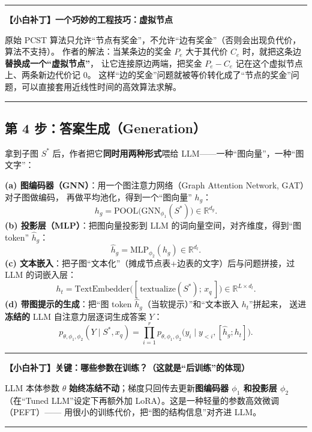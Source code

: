 \documentclass[11pt,UTF8,fontset=fandol]{ctexart}
\newenvironment{tip}[1]{%
  \par\smallskip\noindent\rule{\linewidth}{0.4pt}\par\nobreak
  \noindent\textbf{【小白补丁】#1}\par\nobreak\noindent\ignorespaces
}{%
  \par\noindent\rule{\linewidth}{0.4pt}\par\smallskip
}
\begin{document}
\begin{tip}{一个巧妙的工程技巧：虚拟节点}
原始 PCST 算法只允许“节点有奖金”，不允许“边有奖金”（否则会出现负代价，算法不支持）。
作者的解法：当某条边的奖金 $P_e$ 大于其代价 $C_e$ 时，就把这条边\textbf{替换成一个“虚拟节点”}，
让它连接原边两端，把奖金 $P_e-C_e$ 记在这个虚拟节点上、两条新边代价记 0。
这样“边的奖金”问题就被等价转化成了“节点的奖金”问题，可以直接套用近线性时间的高效算法求解。
\end{tip}

\subsection{第 4 步：答案生成（Generation）}
拿到子图 $S^\ast$ 后，作者把它\textbf{同时用两种形式}喂给 LLM——一种“图向量”，一种“图文字”：

\textbf{(a) 图编码器（GNN）}：用一个图注意力网络（Graph Attention Network, GAT）对子图做编码，
再做平均池化，得到一个“图向量” $h_g$：
\begin{equation*}
  h_g=\mathrm{POOL}\big(\mathrm{GNN}_{\phi_1}(S^\ast)\big)\in\mathbb{R}^{d_g}.\tag{5}
\end{equation*}
\textbf{(b) 投影层（MLP）}：把图向量投影到 LLM 的词向量空间，对齐维度，得到“图 token” $\hat h_g$：
\begin{equation*}
  \hat h_g=\mathrm{MLP}_{\phi_2}(h_g)\in\mathbb{R}^{d_l}.\tag{6}
\end{equation*}
\textbf{(c) 文本嵌入}：把子图“文本化”（摊成节点表+边表的文字）后与问题拼接，过 LLM 的词嵌入层：
\begin{equation*}
  h_t=\mathrm{TextEmbedder}\big([\,\mathrm{textualize}(S^\ast);\,x_q\,]\big)\in\mathbb{R}^{L\times d_l}.\tag{7}
\end{equation*}
\textbf{(d) 带图提示的生成}：把“图 token $\hat h_g$（当软提示）”和“文本嵌入 $h_t$”拼起来，
送进\textbf{冻结的} LLM 自注意力层逐词生成答案 $Y$：
\begin{equation*}
  p_{\theta,\phi_1,\phi_2}(Y\mid S^\ast,x_q)=\prod_{i=1}^{r}
  p_{\theta,\phi_1,\phi_2}\big(y_i\mid y_{<i},[\hat h_g;h_t]\big).\tag{8}
\end{equation*}

\begin{tip}{关键：哪些参数在训练？（这就是“后训练”的体现）}
LLM 本体参数 $\theta$ \textbf{始终冻结不动}；梯度只回传去更新\textbf{图编码器 $\phi_1$ 和投影层 $\phi_2$}
（在“Tuned LLM”设定下再额外加 LoRA）。这是一种轻量的参数高效微调（PEFT）——
用很小的训练代价，把“图的结构信息”对齐进 LLM。
\end{tip}
\end{document}
